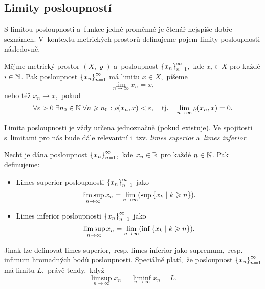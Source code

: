 \subsection{Limity posloupností}\label{subsec:limity-posl-mp}

S limitou posloupnosti a~funkce jedné proměnné je čtenář nejspíše dobře seznámen. V~kontextu metrických prostorů definujeme pojem limity posloupnosti následovně.
\begin{definition}\label{def:limita-mp}
    Mějme metrický prostor $(X,\varrho)$ a~posloupnost $\left\{x_n\right\}_{n=1}^\infty$,~kde $x_i\in X$ pro každé $i\in\mathbb{N}$. Pak posloupnost $\left\{x_n\right\}_{n=1}^\infty$ má limitu $x\in X$,~píšeme
    \[\lim_{n\to\infty}x_n=x,\]
    nebo též $x_n\to x$,~pokud
    \[\forall\varepsilon>0\;\exists n_0\in\mathbb{N}\;\forall n\geqslant n_0: \varrho(x_n,x)<\varepsilon,\quad\text{tj.}\quad\lim_{n\to\infty}\varrho(x_n,x)=0.\]
\end{definition}
Limita posloupnosti je vždy určena jednoznačně (pokud existuje). Ve spojitosti s~limitami pro nás bude dále relevantní i~tzv. \emph{limes superior} a~\emph{limes inferior}.
\begin{definition}\label{def:limsup-liminf-mp}
    Nechť je dána posloupnost $\left\{x_n\right\}_{n=1}^\infty$,~kde $x_n\in\mathbb{R}$ pro každé $n\in\mathbb{N}$. Pak definujeme:
    \begin{itemize}
        \item Limes superior posloupnosti $\left\{x_n\right\}_{n=1}^\infty$ jako
        \[\limsup_{n\to\infty}x_n=\lim_{n\to\infty}(\sup\left\{x_k\mid k\geqslant n\right\}).\]
        \item Limes inferior posloupnosti $\left\{x_n\right\}_{n=1}^\infty$ jako
        \[\limsup_{n\to\infty}x_n=\lim_{n\to\infty}(\inf\left\{x_k\mid k\geqslant n\right\}).\]
    \end{itemize}
\end{definition}
Jinak lze definovat limes superior,~resp. limes inferior jako supremum,~resp. infimum hromadných bodů posloupnosti. Speciálně platí,~že posloupnost $\left\{x_n\right\}_{n=1}^\infty$ má limitu $L$,~právě tehdy,~když
\[\limsup_{n\to\infty}x_n=\liminf_{n\to\infty}x_n=L.\]

